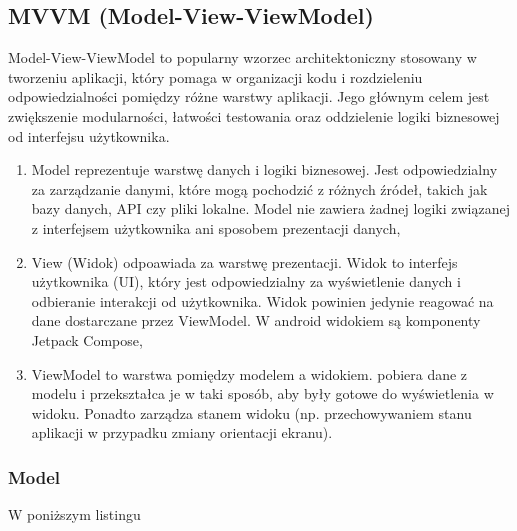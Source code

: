 \documentclass[12pt,twoside]{article}
\begin{document}
\subsection{MVVM (Model-View-ViewModel)}

Model-View-ViewModel to popularny wzorzec architektoniczny stosowany w tworzeniu aplikacji, który pomaga w 
organizacji kodu i rozdzieleniu odpowiedzialności pomiędzy różne warstwy aplikacji. Jego głównym celem
jest zwiększenie modularności, łatwości testowania oraz oddzielenie logiki biznesowej od interfejsu użytkownika.

\begin{enumerate}[label=\alph*), leftmargin=1.25cm]
	\item Model reprezentuje warstwę danych i logiki biznesowej. Jest odpowiedzialny za zarządzanie danymi,
	które mogą pochodzić z różnych źródeł, takich jak bazy danych, API czy pliki lokalne. Model nie zawiera
	żadnej logiki związanej z interfejsem użytkownika ani sposobem prezentacji danych,
	\item View (Widok) odpoawiada za warstwę prezentacji. Widok to interfejs użytkownika (UI), który jest
	odpowiedzialny za wyświetlenie danych i odbieranie interakcji od użytkownika. Widok powinien jedynie
	reagować na dane dostarczane przez ViewModel. W android widokiem są komponenty Jetpack Compose,
	\item ViewModel to warstwa pomiędzy modelem a widokiem. pobiera dane z modelu i przekształca je
	w taki sposób, aby były gotowe do wyświetlenia w widoku. Ponadto zarządza stanem widoku (np. przechowywaniem
	stanu aplikacji w przypadku zmiany orientacji ekranu).
\end{enumerate}

\subsubsection{Model}

W poniższym listingu 

\clearpage


\begin{thebibliography}{4}
\end{thebibliography}

\clearpage

\makesummary
\end{document}
